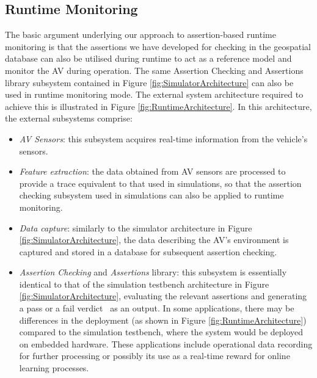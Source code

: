 \subsection{Runtime Monitoring}
The basic argument underlying our approach to assertion-based runtime monitoring is that the assertions we have developed for checking in the geospatial database can also be utilised during runtime to act as a reference model and monitor the AV during operation.
The same Assertion Checking and Assertions library subsystem contained in Figure \ref{fig:SimulatorArchitecture} can also be used in runtime monitoring mode. The external system architecture required to achieve this is illustrated in Figure \ref{fig:RuntimeArchitecture}. In this architecture, the external subsystems comprise:
\begin{itemize}
    \item \emph{AV Sensors}: this subsystem acquires real-time information from the vehicle's sensors.
    \item \emph{Feature extraction}: the data obtained from AV sensors are processed to provide a trace equivalent to that used in simulations, so that the assertion checking subsystem used in simulations can also be applied to runtime monitoring.
    \item \emph{Data capture}: similarly to the simulator architecture in Figure \ref{fig:SimulatorArchitecture}, the data describing the AV's environment is captured and stored in a database for subsequent assertion checking.
    \item \emph{Assertion Checking} and \emph{Assertions} library: this subsystem is essentially identical to that of the simulation testbench architecture in Figure \ref{fig:SimulatorArchitecture}, evaluating the relevant assertions and generating a pass or a fail verdict~\cite{RuntimeReview} as an output. 
    In some applications, there may be differences in the deployment (as shown in Figure \ref{fig:RuntimeArchitecture}) compared to the simulation testbench, where the system would be deployed on embedded hardware. These applications include operational data recording for further processing or possibly its use as a real-time reward for online learning processes.
 
\end{itemize}

  
